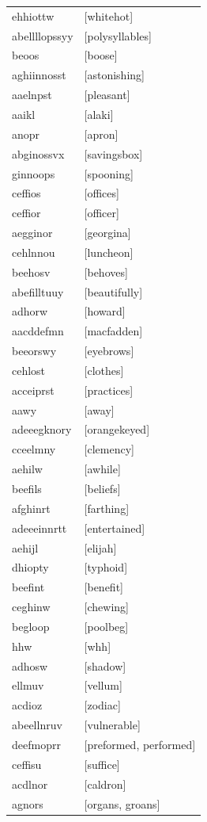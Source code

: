 \documentclass{article}
\begin{document}
\begin{tabular}{ll}
ehhiottw & [whitehot] \\
abellllopssyy & [polysyllables] \\
beoos & [boose] \\
aghiinnosst & [astonishing] \\
aaelnpst & [pleasant] \\
aaikl & [alaki] \\
anopr & [apron] \\
abginossvx & [savingsbox] \\
ginnoops & [spooning] \\
ceffios & [offices] \\
ceffior & [officer] \\
aegginor & [georgina] \\
cehlnnou & [luncheon] \\
beehosv & [behoves] \\
abefilltuuy & [beautifully] \\
adhorw & [howard] \\
aacddefmn & [macfadden] \\
beeorswy & [eyebrows] \\
cehlost & [clothes] \\
acceiprst & [practices] \\
aawy & [away] \\
adeeegknory & [orangekeyed] \\
cceelmny & [clemency] \\
aehilw & [awhile] \\
beefils & [beliefs] \\
afghinrt & [farthing] \\
adeeeinnrtt & [entertained] \\
aehijl & [elijah] \\
dhiopty & [typhoid] \\
beefint & [benefit] \\
ceghinw & [chewing] \\
begloop & [poolbeg] \\
hhw & [whh] \\
adhosw & [shadow] \\
ellmuv & [vellum] \\
acdioz & [zodiac] \\
abeellnruv & [vulnerable] \\
deefmoprr & [preformed, performed] \\
ceffisu & [suffice] \\
acdlnor & [caldron] \\
agnors & [organs, groans] \\

\end{tabular}
\end{document}

